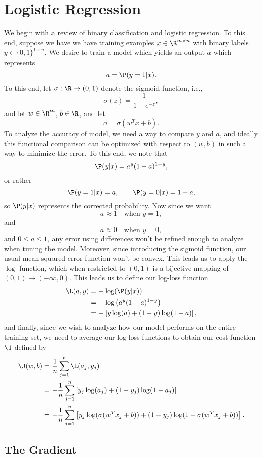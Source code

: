 


\section{Logistic Regression}

We begin with a review of binary classification and logistic regression.  To this end, suppose we have we have training examples $x\in\R^{m\times n}$ with binary labels $y\in\{0,1\}^{1\times n}$.  We desire to train a model which yields an output $a$ which represents
$$a=\P(y=1|x).$$
To this end, let $\sigma:\R\to(0,1)$ denote the sigmoid function, i.e.,
$$\sigma(z)=\frac{1}{1+e^{-z}},$$
and let $w\in\R^m$, $b\in\R$, and let
$$a=\sigma(w^Tx+b).$$
To analyze the accuracy of model, we need a way to compare $y$ and $a$, and ideally this functional comparison can be optimized with respect to $(w,b)$ in such a way to minimize the error.  To this end, we note that
$$\P(y|x)=a^y(1-a)^{1-y},$$
or rather
$$\P(y=1|x)=a,\qquad\P(y=0|x)=1-a,$$
so $\P(y|x)$ represents the corrected probability.    Now since we want
$$a\approx 1\quad\text{when } y=1,$$
and
$$a\approx 0\quad\text{when } y=0,$$
and $0\leq a\leq 1$, any error using differences won't be refined enough to analyze when tuning the model.  Moreover, since introducing the sigmoid function, our usual mean-squared-error function won't be convex.  This leads us to apply the $\log$ function, which when restricted to $(0,1)$ is a bijective mapping of $(0,1)\to(-\infty,0)$.  This leads us to define our log-loss function
\begin{align*}
	\L(a,y)&=-\log(\P(y|x))\\
	&=-\log\left(a^y(1-a)^{1-y}\right)\\
	&=-\left[y\log(a)+(1-y)\log(1-a)\right],
\end{align*}
and finally, since we wish to analyze how our model performs on the entire training set, we need to average our log-loss functions to obtain our cost function $\J$ defined by
\begin{align*}
	\J(w,b)&=\frac{1}{n}\sum_{j=1}^n\L(a_j,y_j)\\
	&=-\frac{1}{n}\sum_{j=1}^n\left[y_j\log(a_j)+(1-y_j)\log(1-a_j)\right]\\
	&=-\frac{1}{n}\sum_{j=1}^n\left[y_j\log(\sigma(w^Tx_j+b))+(1-y_j)\log(1-\sigma(w^Tx_j+b))\right].
\end{align*}

\subsection{The Gradient}

